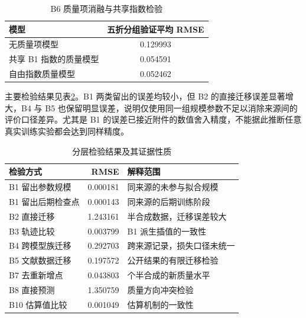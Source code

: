 \documentclass[bwprint]{gmcmthesis}
\numberwithin{equation}{section}
\numberwithin{figure}{section}
\numberwithin{table}{section}
\begin{document}
        \begin{table}[H]
         \centering
         \caption{B6 质量项消融与共享指数检验}
         \label{tab:p2_quality_ablation}
         \begin{tabular}{lc}
          \toprule
          模型 & 五折分组验证平均 RMSE \\
          \midrule
          无质量项模型 & 0.129993 \\
          共享 B1 指数的质量模型 & 0.054591 \\
          自由指数质量模型 & 0.052462 \\
          \bottomrule
         \end{tabular}
        \end{table}
        
        主要检验结果见表\ref{tab:p2_validation}。B1 两类留出的误差均较小，但 B2 的直接迁移误差显著增大，B4 与 B5 也保留明显误差，说明仅使用同一组规模参数不足以消除来源间的评价口径差异。尤其是 B1 的误差已接近附件的数值舍入精度，不能据此推断任意真实训练实验都会达到同样精度。
        
        \begin{table}[H]
         \centering
         \caption{分层检验结果及其证据性质}
         \label{tab:p2_validation}
         \begin{tabularx}{\linewidth}{@{}l r >{\raggedright\arraybackslash}X@{}}
          \toprule
          检验方式 & RMSE & 解释范围 \\
          \midrule
          B1 留出参数规模 & 0.000181 & 同来源的未参与拟合规模 \\
          B1 留出后期检查点 & 0.000143 & 同来源的后期训练阶段 \\
          B2 直接迁移 & 1.243161 & 半合成数据，迁移误差较大 \\
          B3 轨迹比较 & 0.003799 & B1 派生插值的一致性 \\
          B4 跨模型族迁移 & 0.292703 & 跨来源记录，损失口径未统一 \\
          B5 文献数据迁移 & 0.197572 & 公开结果的有限迁移检验 \\
          B7 去重新增点 & 0.043803 & 90 个半合成的新质量水平 \\
          B8 直接预测 & 1.350759 & 质量方向冲突检验 \\
          B10 估算值比较 & 0.001049 & 估算机制的一致性 \\
          \bottomrule
         \end{tabularx}
        \end{table}
        
\end{document}
